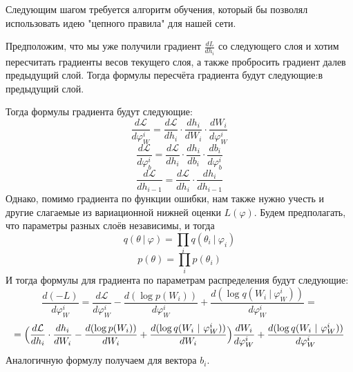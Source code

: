 Следующим шагом требуется алгоритм обучения, который бы позволял использовать идею "цепного правила" для нашей сети.

Предположим, что мы уже получили градиент $\frac{dL}{dh_i}$ со следующего слоя и хотим пересчитать градиенты весов текущего слоя, а также пробросить градиент далев предыдущий слой. Тогда формулы пересчёта градиента будут следующие:в предыдущий слой.

Тогда формулы градиента будут следующие:
$$\frac{d\mathcal{L}}{d\varphi_W^i} = \frac{d\mathcal{L}}{dh_i} \cdot \frac{dh_i}{dW_i} \cdot \frac{dW_i}{d\varphi_W^i}$$
$$\frac{d\mathcal{L}}{d\varphi_b^i} = \frac{d\mathcal{L}}{dh_i} \cdot \frac{dh_i}{db_i} \cdot \frac{db_i}{d\varphi_b^i}$$
$$\frac{d\mathcal{L}}{dh_{i-1}} = \frac{d\mathcal{L}}{dh_i} \cdot \frac{dh_i}{dh_{i-1}}$$
Однако, помимо градиента по функции ошибки, нам также нужно учесть и другие слагаемые из вариационной нижней оценки $L(\varphi)$. Будем предполагать, что
 параметры разных слоёв независимы, и тогда
$$q(\theta\ |\ \varphi) = \prod_i q(\theta_i\ |\ \varphi_i)$$
$$p(\theta) = \prod_i p(\theta_i)$$
И тогда формулы для градиента по параметрам распределения будут следующие:
$$\frac{d(-L)}{d\varphi_W^i} = \frac{d\mathcal{L}}{d\varphi_W^i} - \frac{d(\log p(W_i))}{d\varphi_W^i} + \frac{d(\log q(W_i\ |\ \varphi_W^i))}{d\varphi_W^i}=$$
$$=\Bigl(\frac{d\mathcal{L}}{dh_i} \cdot \frac{dh_i}{dW_i} - \frac{d(\log p(W_i))}{dW_i} + \frac{d(\log q(W_i\ |\ \varphi_W^i))}{dW_i}\Bigr) \frac{dW_i}{d\varphi_W^i} + \frac{d(\log q(W_i\ |\ \varphi_W^i))}{d\varphi_W^i}$$
Аналогичную формулу получаем для вектора $b_i$.

